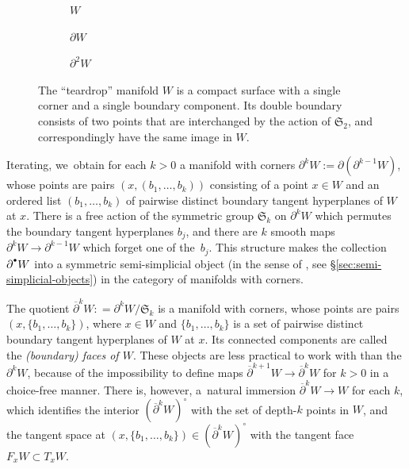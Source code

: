 \documentclass[10pt]{amsart}
\let\oldbullet\bullet
\renewcommand{\bullet}{{\raisebox{1pt}{$\scriptscriptstyle\oldbullet$}}}
\theoremstyle{definition}
\theoremstyle{remark}
\let\defn\emph
\newcommand{\defas}{\mathrel{\mathop:}=}
\newcommand{\tb}[2][]{T_{#1}#2}
\newcommand{\symgp}[1]{\mathfrak{S}_{#1}}
\begin{document}
\begin{figure}
\centering
\begin{subfigure}[t]{0.3\textwidth}
\centering
{}
\caption{$ W$}
\end{subfigure}
\begin{subfigure}[t]{0.3\textwidth}
\centering
{}
\caption{$\partial W$}
\end{subfigure}
\begin{subfigure}[t]{0.3\textwidth}
\centering
{}
\caption{$\partial^2 W$}
\end{subfigure}
\caption{The ``teardrop'' manifold $ W$ is a compact surface with a single corner and a single boundary component. Its double boundary consists of two points that are interchanged by the action of $\symgp{2}$, and correspondingly have the same image in $ W$.}
\label{fig:teardrop}
\end{figure}

Iterating, we~obtain for each $k>0$ a manifold with corners $\partial^{k} W:=\partial (\partial^{k-1}W)$, whose points are pairs $(x,(b_1,\ldots,b_k))$ consisting of a point $x\in W$ and an ordered list $(b_1,\ldots,b_k)$ of pairwise distinct boundary tangent hyperplanes of $ W$ at $x$. There is a free action of the symmetric group $\mathfrak{S}_k$ on $\partial^k W$ which permutes the boundary tangent hyperplanes $b_j$, and there are $k$ smooth maps $\partial^k W\to \partial^{k-1} W$ which forget one of the~$b_j$. This structure makes the collection $\partial^\bullet W$ into a symmetric semi-simplicial object (in the sense of \cite{ChanGalatiusPayne}, see \S\ref{sec:semi-simplicial-objects}) in the category of manifolds with corners.

The quotient $
\overline{\partial}^k W \defas \partial^k W/\mathfrak{S}_k$ is a manifold with corners, whose points are pairs $(x,\{b_1,\ldots,b_k\})$, where $x\in W$ and $\{b_1,\ldots,b_k\}$ is a set of pairwise distinct boundary tangent hyperplanes of $ W$ at $x$. Its connected components are called the \defn{(boundary) faces of $W$}. These objects are less practical to work with than the $\partial^k W$, because of the impossibility to define maps $\overline{\partial}^{k+1} W\to \overline{\partial}^{k} W$ for $k > 0$ in a choice-free manner. There is, however, a~natural immersion $\overline{\partial}^k W\to W$ for each $k$, which identifies the interior $(\overline{\partial}^kW)^\circ$ with the set of depth-$k$ points in $W$, and the tangent space at $(x,\{b_1,\ldots,b_k\})\in (\overline{\partial}^kW)^\circ$ with the tangent face $F_xW\subset \tb[x]{W}$.
\end{document}
